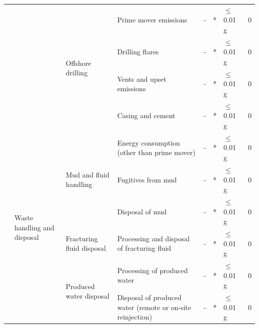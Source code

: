 \documentclass[11pt]{report}
\begin{document}
{{{{\begin{landscape}
\begin{table}
\begin{scriptsize}
\begin{tabular}{|p{}|p{}|p{}|p{}|r|p{}|p{}|p{}|}
\cline{3-8}
& & \multirow{4}{0.09\columnwidth}{Offshore drilling} & Prime mover emissions & - & * & $\leq$ 0.01 g & 0\\
\cline{4-8}
& & & Drilling flares & - & * & $\leq$ 0.01 g & 0\\
\cline{4-8}
& & & Vents and upset emissions & - & * & $\leq$ 0.01 g & 0\\
\cline{4-8}
& & & Casing and cement & - & * & $\leq$ 0.01 g & 0\\
\cline{2-8}
& \multirow{6}{0.09\columnwidth}{Waste handling and disposal} & \multirow{3}{0.09\columnwidth}{Mud and fluid handling} & Energy consumption (other than prime mover) & - & * & $\leq$ 0.01 g & 0\\
\cline{4-8}
& & & Fugitives from mud & - & * & $\leq$ 0.01 g & 0\\
\cline{4-8}
& & & Disposal of mud & - & * & $\leq$ 0.01 g & 0\\
\cline{3-8}
& & Fracturing fluid disposal & Processing and disposal of fracturing fluid & - & * & $\leq$ 0.01 g & 0\\
\cline{3-8}
& & \multirow{2}{0.09\columnwidth}{Produced water disposal} & Processing of produced water & - & * & $\leq$ 0.01 g & 0\\
\cline{4-8}
& & & Disposal of produced water (remote or on-site reinjection) & - & * & $\leq$ 0.01 g & 0\\
\hline
\end{tabular}
\end{scriptsize}
\end{table}



\end{landscape}}}}}
\end{document}
